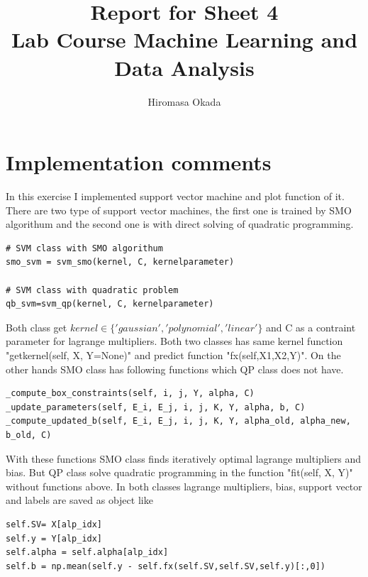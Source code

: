 \documentclass[a4paper,11pt]{article}
\begin{document}
\author{Hiromasa Okada}
\title{\vspace{-2cm}Report for Sheet 4\\
\small{Lab Course Machine Learning and Data Analysis}}
\maketitle

\section*{Implementation comments}
In this exercise I implemented support vector machine and plot function of it. There are two type of support vector machines, the first one is trained by SMO algorithum and the second one is with direct solving of quadratic programming.

\begin{verbatim}
# SVM class with SMO algorithum
smo_svm = svm_smo(kernel, C, kernelparameter) 

# SVM class with quadratic problem
qb_svm=svm_qp(kernel, C, kernelparameter) 

\end{verbatim}

Both class get $kernel \in \{ 'gaussian','polynomial','linear' \}$ and C as a contraint parameter for lagrange multipliers. Both two classes has same kernel function "getkernel(self, X, Y=None)" and predict function "fx(self,X1,X2,Y)". 
On the other hands SMO class has following functions which QP class does not have.

\begin{verbatim}
_compute_box_constraints(self, i, j, Y, alpha, C)
_update_parameters(self, E_i, E_j, i, j, K, Y, alpha, b, C)
_compute_updated_b(self, E_i, E_j, i, j, K, Y, alpha_old, alpha_new, b_old, C)
\end{verbatim}

With these functions SMO class finds iteratively optimal lagrange multipliers and bias. But QP class solve quadratic programming in the function "fit(self, X, Y)" without functions above.
In both classes lagrange multipliers, bias, support vector and labels are saved as object like

\begin{verbatim}
self.SV= X[alp_idx]
self.y = Y[alp_idx]
self.alpha = self.alpha[alp_idx]
self.b = np.mean(self.y - self.fx(self.SV,self.SV,self.y)[:,0])
\end{verbatim}
\end{document}
